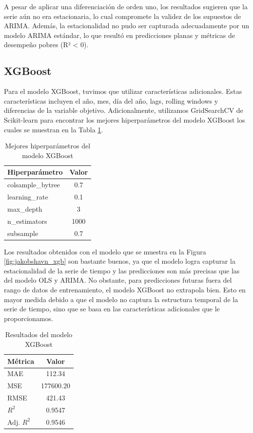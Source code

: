 \documentclass[sigconf,authordraft,language=spanish]{acmart}
\begin{document}
A pesar de aplicar una diferenciación de orden uno, los resultados sugieren  que la serie aún no era estacionaria, lo cual compromete la validez de los supuestos
 de ARIMA. Además, la estacionalidad  no pudo ser capturada adecuadamente por un modelo ARIMA estándar, lo que resultó en predicciones planas y métricas
 de desempeño pobres (R² < 0).

\subsection{XGBoost}

Para el modelo XGBoost, tuvimos que utilizar características adicionales.
Estas características incluyen el año, mes, día del año, lags, rolling windows y diferencias de la variable objetivo.
Adicionalmente, utilizamos GridSearchCV de Scikit-learn \cite{Pedregosa_Scikit-learn_Machine_Learning_2011} para encontrar los mejores hiperparámetros del modelo XGBoost los cuales se muestran en la Tabla \ref{tab:xgb_params}.

\begin{table}[H]
  \caption{Mejores hiperparámetros del modelo XGBoost}
  \label{tab:xgb_params}
  \begin{tabular}{lc}
    \toprule
    Hiperparámetro & Valor \\
    \midrule
    colsample\_bytree & 0.7 \\
    learning\_rate & 0.1 \\
    max\_depth & 3 \\
    n\_estimators & 1000 \\
    subsample & 0.7 \\
    \bottomrule
  \end{tabular}
\end{table}

Los resultados obtenidos con el modelo que se muestra en la Figura \ref{fig:jakobshavn_xgb}
son bastante buenos, ya que el modelo logra capturar la estacionalidad de la serie de tiempo y las predicciones son más precisas que las del modelo OLS y ARIMA.
No obstante, para predicciones futuras fuera del rango de datos de entrenamiento, el modelo XGBoost no extrapola bien.
Esto en mayor medida debido a que el modelo no captura la estructura temporal de la serie de tiempo, sino que se basa en las características adicionales que le proporcionamos.

\begin{table}[H]
  \caption{Resultados del modelo XGBoost}
  \label{tab:xgb}
  \begin{tabular}{lc}
    \toprule
    Métrica & Valor \\
    \midrule
    MAE & 112.34 \\
    MSE & 177600.20 \\
    RMSE & 421.43 \\
    $R^2$ & 0.9547 \\
    Adj. $R^2$ & 0.9546 \\
    \bottomrule
  \end{tabular}
\end{table}
\end{document}
